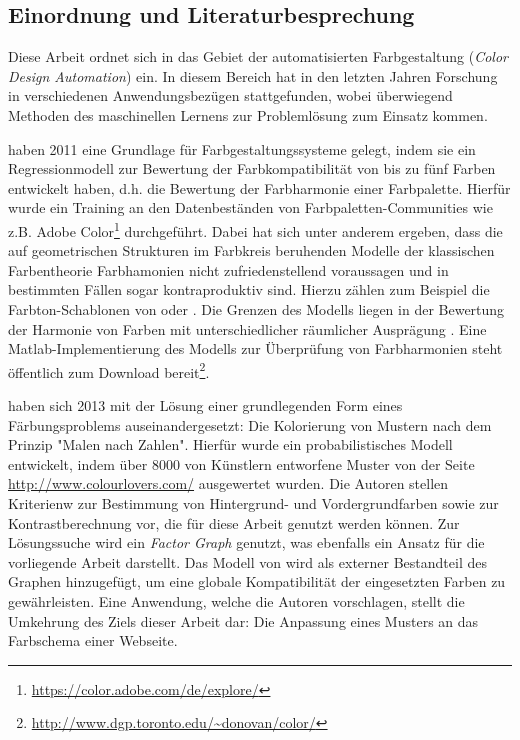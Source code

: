 \documentclass[11pt, bibliography=totoc]{scrartcl}
\begin{document}
\subsection{Einordnung und Literaturbesprechung}
\label{sec:literatur}

Diese Arbeit ordnet sich in das Gebiet der automatisierten Farbgestaltung (\emph{Color Design Automation}) ein. In diesem Bereich hat in den letzten Jahren Forschung in verschiedenen Anwendungsbezügen stattgefunden, wobei überwiegend Methoden des maschinellen Lernens zur Problemlösung zum Einsatz kommen.

\citet{colorcomp} haben 2011 eine Grundlage für Farbgestaltungssysteme gelegt, indem sie ein Regressionmodell zur Bewertung der Farbkompatibilität von bis zu fünf Farben entwickelt haben, d.h. die Bewertung der Farbharmonie einer Farbpalette. Hierfür wurde ein Training an den Datenbeständen von Farbpaletten-Communities wie z.B. Adobe Color\footnote{\url{https://color.adobe.com/de/explore/}} durchgeführt. Dabei hat sich unter anderem ergeben, dass die auf geometrischen Strukturen im Farbkreis beruhenden Modelle der klassischen Farbentheorie Farbhamonien nicht zufriedenstellend voraussagen und in bestimmten Fällen sogar kontraproduktiv sind. Hierzu zählen zum Beispiel die Farbton-Schablonen von \citet{itten} oder \citet{munsell}. Die Grenzen des Modells liegen in der Bewertung der Harmonie von Farben mit unterschiedlicher räumlicher Ausprägung \citep{webpage, patterns}. Eine Matlab-Implementierung des Modells zur Überprüfung von Farbharmonien steht öffentlich zum Download bereit\footnote{\url{http://www.dgp.toronto.edu/~donovan/color/}}.

\citet{patterns} haben sich 2013 mit der Lösung einer grundlegenden Form eines Färbungsproblems auseinandergesetzt: Die Kolorierung von Mustern nach dem Prinzip "Malen nach Zahlen". Hierfür wurde ein probabilistisches Modell entwickelt, indem über 8000 von Künstlern entworfene Muster von der Seite \url{http://www.colourlovers.com/} ausgewertet wurden. Die Autoren stellen Kriterienw zur Bestimmung von Hintergrund- und Vordergrundfarben sowie zur Kontrastberechnung vor, die für diese Arbeit genutzt werden können. Zur Lösungssuche wird ein \emph{Factor Graph} genutzt, was ebenfalls ein Ansatz für die vorliegende Arbeit darstellt. Das Modell von \citet{colorcomp} wird als externer Bestandteil des Graphen hinzugefügt, um eine globale Kompatibilität der eingesetzten Farben zu gewährleisten. Eine Anwendung, welche die Autoren vorschlagen, stellt die Umkehrung des Ziels dieser Arbeit dar: Die Anpassung eines Musters an das Farbschema einer Webseite.
\end{document}
